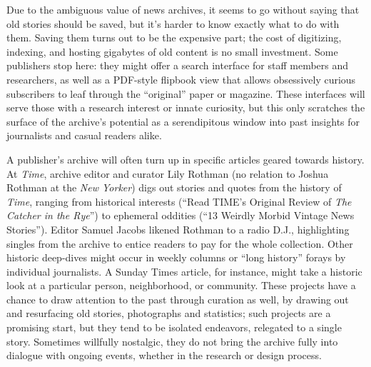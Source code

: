 Due to the ambiguous value of news archives, it seems to go without saying that old stories should be saved, but it's harder to know exactly what to do with them. Saving them turns out to be the expensive part; the cost of digitizing, indexing, and hosting gigabytes of old content is no small investment. Some publishers stop here: they might offer a search interface for staff members and researchers, as well as a PDF-style flipbook view that allows obsessively curious subscribers to leaf through the ``original'' paper or magazine. These interfaces will serve those with a research interest or innate curiosity, but this only scratches the surface of the archive's potential as a serendipitous window into past insights for journalists and casual readers alike.

A publisher's archive will often turn up in specific articles geared towards history. At \emph{Time}, archive editor and curator Lily Rothman (no relation to Joshua Rothman at the \emph{New Yorker}) digs out stories and quotes from the history of \emph{Time}, ranging from historical interests (``Read TIME's Original Review of \emph{The Catcher in the Rye}'') to ephemeral oddities (``13 Weirdly Morbid Vintage News Stories''). Editor Samuel Jacobs likened Rothman to a radio D.J., highlighting singles from the archive to entice readers to pay for the whole collection.\autocite{levy_time.com_2014} Other historic deep-dives might occur in weekly columns or ``long history'' forays by individual journalists. A Sunday Times article, for instance, might take a historic look at a particular person, neighborhood, or community. These projects have a chance to draw attention to the past through curation as well, by drawing out and resurfacing old stories, photographs and statistics; such projects are a promising start, but they tend to be isolated endeavors, relegated to a single story. Sometimes willfully nostalgic, they do not bring the archive fully into dialogue with ongoing events, whether in the research or design process.


